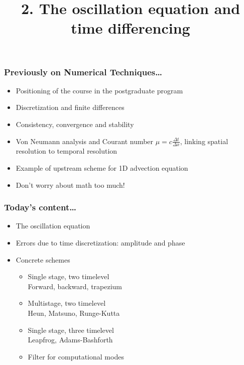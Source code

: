 \documentclass[aspectratio=43,9pt]{beamer}
\title{2. The oscillation equation and time differencing}%
\begin{document}
%
%
\begin{frame}[plain]
	\titlepage
\end{frame}
%
%
\begin{frame}
	\frametitle{Previously on Numerical Techniques\ldots}
	\begin{itemize}
		\item Positioning of the course in the postgraduate program\vspace*{2ex}
		\item Discretization and finite differences\vspace*{2ex}
		\item Consistency, convergence and stability\vspace*{2ex}
		\item Von Neumann analysis and Courant number $\mu=c\frac{\Delta t}{\Delta x}$, linking spatial resolution to temporal resolution\vspace*{2ex}
		\item Example of upstream scheme for 1D advection equation\vspace*{2ex}
		\item Don't worry about math too much!
	\end{itemize}
\end{frame}
%
%
\begin{frame}
	\frametitle{Today's content\ldots}
	\begin{itemize}
		\item The oscillation equation\vspace*{2ex}
		\item Errors due to time discretization: amplitude and phase\vspace*{2ex}
		\item Concrete schemes\vspace*{1ex}
			\begin{itemize}
				\item Single stage, two timelevel\\
					\hspace*{5mm} Forward, backward, trapezium\vspace*{1ex}
				\item Multistage, two timelevel\\
					\hspace*{5mm} Heun, Matsuno, Runge-Kutta\vspace*{1ex}
				\item Single stage, three timelevel\\
					\hspace*{5mm} Leapfrog, Adams-Bashforth\vspace*{1ex}
				\item Filter for computational modes
			\end{itemize}
	\end{itemize}
\end{frame}
\end{document}

